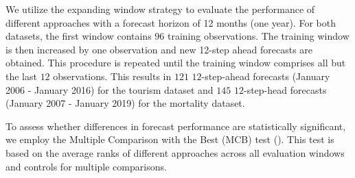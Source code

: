 \documentclass[a4paper,review,12pt,authoryear]{elsarticle}
\begin{document}


We utilize the expanding window strategy to evaluate the performance of different approaches with a forecast horizon of 12 months (one year). For both datasets, the first window contains $96$ training observations. The training window is then increased by one observation and new 12-step ahead forecasts are obtained. This procedure is repeated until the training window comprises all but the  last $12$ observations. This results in $121$ $12$-step-ahead forecasts (January 2006 - January 2016) for the tourism dataset and $145$ $12$-step-head forecasts (January 2007 - January 2019) for the mortality dataset. %

To assess whether differences in forecast performance are statistically significant, we employ the Multiple Comparison with the Best (MCB) test (\citealp{koningM3CompetitionStatistical2005}). This test is based on the average ranks of different approaches across all evaluation windows and controls for multiple comparisons. 
\end{document}
